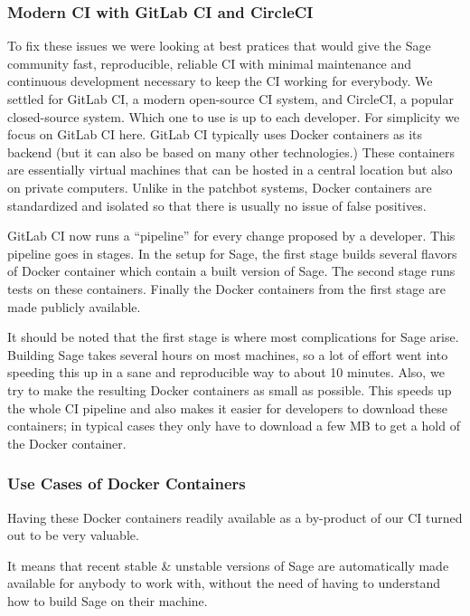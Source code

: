 \documentclass{deliverablereport}
\begin{document}
\subsubsection{Modern CI with GitLab CI and CircleCI}
To fix these issues we were looking at best pratices that would give the
Sage community fast, reproducible, reliable CI with minimal maintenance and
continuous development necessary to keep the CI working for everybody.  We
settled for GitLab CI, a modern open-source CI system, and CircleCI, a popular
closed-source system. Which one to use is up to each developer. For simplicity
we focus on GitLab CI here. GitLab CI typically uses Docker containers as its
backend (but it can also be based on many other technologies.) These containers
are essentially virtual machines that can be hosted in a central location but
also on private computers. Unlike in the patchbot systems, Docker containers
are standardized and isolated so that there is usually no issue of false
positives.

GitLab CI now runs a ``pipeline'' for every change proposed by a developer.
This pipeline goes in stages. In the setup for Sage, the first stage builds
several flavors of Docker container which contain a built version of Sage. The
second stage runs tests on these containers. Finally the Docker containers from
the first stage are made publicly available.

It should be noted that the first stage is where most complications for Sage
arise. Building Sage takes several hours on most machines, so a lot of effort
went into speeding this up in a sane and reproducible way to about 10 minutes.
Also, we try to make the resulting Docker containers as small as possible. This
speeds up the whole CI pipeline and also makes it easier for developers to
download these containers; in typical cases they only have to download a few MB
to get a hold of the Docker container.

\subsubsection{Use Cases of Docker Containers}
Having these Docker containers readily available as a by-product of our CI turned out to be very valuable.

It means that recent stable \& unstable versions of Sage are automatically made
available for anybody to work with, without the need of having to understand
how to build Sage on their machine.
\end{document}
